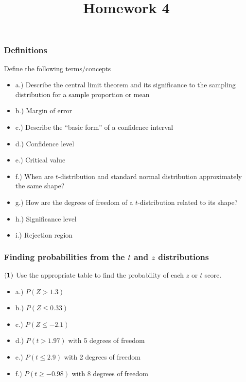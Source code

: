 \documentclass[
]{article}
\title{Homework 4}
\author{}
\date{\vspace{-2.5em}}
\begin{document}
\maketitle

\subsubsection{Definitions}\label{definitions}

Define the following terms/concepts

\begin{itemize}
\item
  a.) Describe the central limit theorem and its significance to the
  sampling distribution for a sample proportion or mean
\item
  b.) Margin of error
\item
  c.) Describe the ``basic form'' of a confidence interval
\item
  d.) Confidence level
\item
  e.) Critical value
\item
  f.) When are \(t\)-distribution and standard normal distribution
  approximately the same shape?
\item
  g.) How are the degrees of freedom of a \(t\)-distribution related to
  its shape?
\item
  h.) Significance level
\item
  i.) Rejection region
\end{itemize}

\subsubsection{\texorpdfstring{Finding probabilities from the \(t\) and
\(z\)
distributions}{Finding probabilities from the t and z distributions}}\label{finding-probabilities-from-the-t-and-z-distributions}

\(\bf (1)\) Use the appropriate table to find the probability of each
\(z\) or \(t\) score.

\begin{itemize}
\item
  a.) \(P(Z > 1.3)\)
\item
  b.) \(P(Z \leq 0.33)\)
\item
  c.) \(P(Z \leq -2.1)\)
\item
  d.) \(P(t > 1.97)\) with 5 degrees of freedom
\item
  e.) \(P(t \leq 2.9)\) with 2 degrees of freedom
\item
  f.) \(P(t \geq -0.98)\) with 8 degrees of freedom
\end{itemize}
\end{document}
